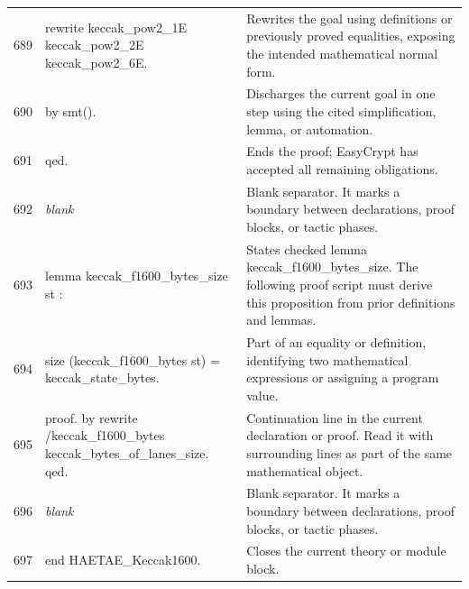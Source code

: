 \documentclass[10pt]{article}
\begin{document}
\begin{longtable}{r L{0.53\textwidth} L{0.37\textwidth}}
689 & {\ttfamily\scriptsize rewrite keccak\_pow2\_1E keccak\_pow2\_2E keccak\_pow2\_6E.} & Rewrites the goal using definitions or previously proved equalities, exposing the intended mathematical normal form. \\
690 & {\ttfamily\scriptsize by smt().} & Discharges the current goal in one step using the cited simplification, lemma, or automation. \\
691 & {\ttfamily\scriptsize qed.} & Ends the proof; EasyCrypt has accepted all remaining obligations. \\
692 & {\ttfamily\scriptsize \emph{blank}} & Blank separator.  It marks a boundary between declarations, proof blocks, or tactic phases. \\
693 & {\ttfamily\scriptsize lemma keccak\_f1600\_bytes\_size st :} & States checked lemma keccak\_f1600\_bytes\_size.  The following proof script must derive this proposition from prior definitions and lemmas. \\
694 & {\ttfamily\scriptsize   size (keccak\_f1600\_bytes st) = keccak\_state\_bytes.} & Part of an equality or definition, identifying two mathematical expressions or assigning a program value. \\
695 & {\ttfamily\scriptsize proof. by rewrite /keccak\_f1600\_bytes keccak\_bytes\_of\_lanes\_size. qed.} & Continuation line in the current declaration or proof.  Read it with surrounding lines as part of the same mathematical object. \\
696 & {\ttfamily\scriptsize \emph{blank}} & Blank separator.  It marks a boundary between declarations, proof blocks, or tactic phases. \\
697 & {\ttfamily\scriptsize end HAETAE\_Keccak1600.} & Closes the current theory or module block. \\
\bottomrule
\end{longtable}
\end{document}
